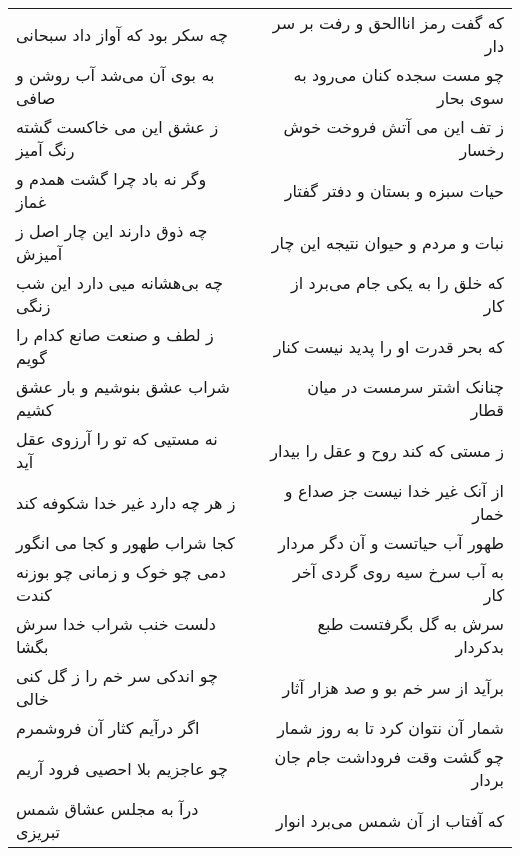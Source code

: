 \begin{center}
\begin{longtable}{l p{0.5cm} r}
چه سکر بود که آواز داد سبحانی
&&
که گفت رمز اناالحق و رفت بر سر دار
\\
به بوی آن می‌شد آب روشن و صافی
&&
چو مست سجده کنان می‌رود به سوی بحار
\\
ز عشق این می خاکست گشته رنگ آمیز
&&
ز تف این می آتش فروخت خوش رخسار
\\
وگر نه باد چرا گشت همدم و غماز
&&
حیات سبزه و بستان و دفتر گفتار
\\
چه ذوق دارند این چار اصل ز آمیزش
&&
نبات و مردم و حیوان نتیجه این چار
\\
چه بی‌هشانه میی دارد این شب زنگی
&&
که خلق را به یکی جام می‌برد از کار
\\
ز لطف و صنعت صانع کدام را گویم
&&
که بحر قدرت او را پدید نیست کنار
\\
شراب عشق بنوشیم و بار عشق کشیم
&&
چنانک اشتر سرمست در میان قطار
\\
نه مستیی که تو را آرزوی عقل آید
&&
ز مستی که کند روح و عقل را بیدار
\\
ز هر چه دارد غیر خدا شکوفه کند
&&
از آنک غیر خدا نیست جز صداع و خمار
\\
کجا شراب طهور و کجا می انگور
&&
طهور آب حیاتست و آن دگر مردار
\\
دمی چو خوک و زمانی چو بوزنه کندت
&&
به آب سرخ سیه روی گردی آخر کار
\\
دلست خنب شراب خدا سرش بگشا
&&
سرش به گل بگرفتست طبع بدکردار
\\
چو اندکی سر خم را ز گل کنی خالی
&&
برآید از سر خم بو و صد هزار آثار
\\
اگر درآیم کثار آن فروشمرم
&&
شمار آن نتوان کرد تا به روز شمار
\\
چو عاجزیم بلا احصیی فرود آریم
&&
چو گشت وقت فروداشت جام جان بردار
\\
درآ به مجلس عشاق شمس تبریزی
&&
که آفتاب از آن شمس می‌برد انوار
\\
\end{longtable}
\end{center}
